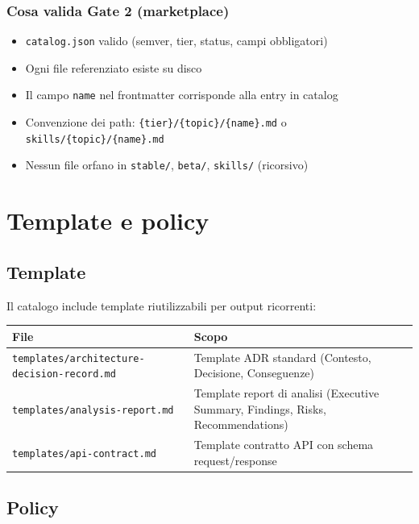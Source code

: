 \documentclass[12pt,a4paper,twoside]{book}
\begin{document}
\subsection{Cosa valida Gate 2 (marketplace)}

\begin{itemize}
  \item \texttt{catalog.json} valido (semver, tier, status, campi obbligatori)
  \item Ogni file referenziato esiste su disco
  \item Il campo \texttt{name} nel frontmatter corrisponde alla entry in catalog
  \item Convenzione dei path: \texttt{\{tier\}/\{topic\}/\{name\}.md} o \texttt{skills/\{topic\}/\{name\}.md}
  \item Nessun file orfano in \texttt{stable/}, \texttt{beta/}, \texttt{skills/} (ricorsivo)
\end{itemize}

\chapter{Template e policy}

\section{Template}

Il catalogo include template riutilizzabili per output ricorrenti:

\begin{center}
\begin{tabular}{ll}
\toprule
\textbf{File} & \textbf{Scopo} \\
\midrule
\texttt{templates/architecture-decision-record.md} & Template ADR standard (Contesto, Decisione, Conseguenze) \\
\texttt{templates/analysis-report.md} & Template report di analisi (Executive Summary, Findings, Risks, Recommendations) \\
\texttt{templates/api-contract.md} & Template contratto API con schema request/response \\
\bottomrule
\end{tabular}
\end{center}

\section{Policy}
\end{document}
